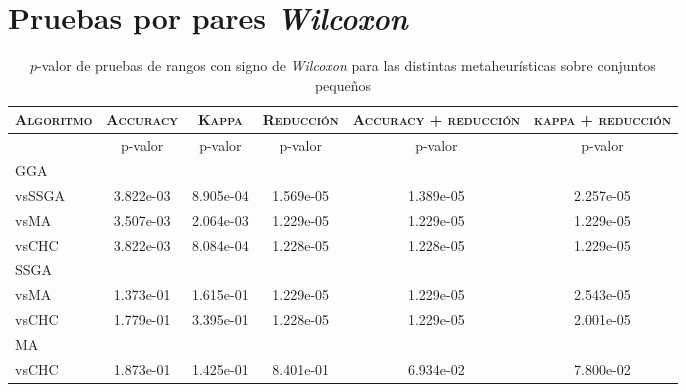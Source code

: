 \chapter{Pruebas por pares \emph{Wilcoxon}}
\label{Apéndices}

\begin{table}[h!]
\centering
\begin{adjustbox}{max width =\textwidth}
\begin{tabular}{l c c c c c}
\hline
	\textsc{Algoritmo}
	& \multicolumn{1}{c}{\textsc{Accuracy}}
	& \multicolumn{1}{c}{\textsc{Kappa}}
	& \multicolumn{1}{c}{\textsc{Reducción}} 
	& \multicolumn{1}{c}{\textsc{Accuracy + reducción}} 
	& \multicolumn{1}{c}{\textsc{kappa + reducción}} \\
\hline
\hline

 & p-valor & p-valor & p-valor & p-valor & p-valor \\

GGA \\
vsSSGA & 3.822e-03 & 8.905e-04 & 1.569e-05 & 1.389e-05 & 2.257e-05 \\ 
vsMA & 3.507e-03 & 2.064e-03 & 1.229e-05 & 1.229e-05 & 1.229e-05 \\ 
vsCHC & 3.822e-03 & 8.084e-04 & 1.228e-05 & 1.228e-05 & 1.229e-05 \\

\hline

SSGA \\
vsMA & 1.373e-01 & 1.615e-01 & 1.229e-05 & 1.229e-05 & 2.543e-05 \\
vsCHC & 1.779e-01 & 3.395e-01 & 1.228e-05 & 1.229e-05 & 2.001e-05 \\

\hline

MA \\
vsCHC & 1.873e-01 & 1.425e-01 & 8.401e-01 & 6.934e-02 & 7.800e-02 \\ 

\hline

\end{tabular}
\end{adjustbox}
\caption[Pruebas de \emph{Wilcoxon} entre las metaheurísticas para conjuntos pequeños]{$p$-valor de pruebas de rangos con signo de \emph{Wilcoxon} para las distintas metaheurísticas sobre conjuntos pequeños}
\label{wilcox-meta-peq}
\end{table}

